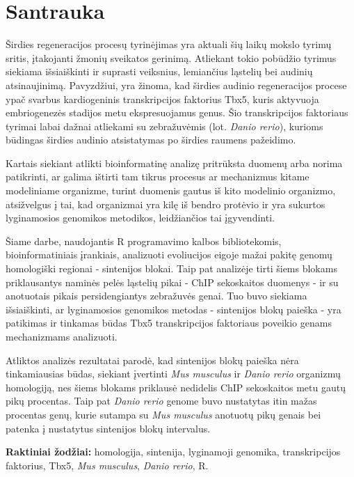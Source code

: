 \documentclass[12pt]{article}
\begin{document}

\section*{Santrauka}
Širdies regeneracijos procesų tyrinėjimas yra aktuali šių laikų mokslo tyrimų
sritis, įtakojanti žmonių sveikatos gerinimą. Atliekant tokio pobūdžio
tyrimus siekiama išsiaiškinti ir suprasti veiksnius, lemiančius ląstelių bei
audinių atsinaujinimą. Pavyzdžiui, yra žinoma, kad širdies audinio regeneracijos
procese ypač svarbus kardiogeninis transkripcijos faktorius Tbx5, kuris
aktyvuoja embriogenezės stadijos metu ekspresuojamus genus. Šio transkripcijos
faktoriaus tyrimai labai dažnai atliekami su zebražuvėmis (lot.
\emph{Danio rerio}), kurioms būdingas širdies audinio atsistatymas po širdies
raumens pažeidimo.

Kartais siekiant atlikti bioinformatinę analizę pritrūksta duomenų arba norima
patikrinti, ar galima ištirti tam tikrus procesus ar mechanizmus kitame
modeliniame organizme, turint duomenis gautus iš kito modelinio organizmo,
atsižvelgus į tai, kad organizmai yra kilę iš bendro protėvio ir yra sukurtos
lyginamosios genomikos metodikos, leidžiančios tai įgyvendinti.

Šiame darbe, naudojantis R programavimo kalbos bibliotekomis, bioinformatiniais
įrankiais, analizuoti evoliucijos eigoje mažai pakitę genomų homologiški
regionai - sintenijos blokai. Taip pat analizėje tirti šiems blokams
priklausantys naminės pelės ląstelių pikai - ChIP sekoskaitos duomenys - ir su
anotuotais pikais persidengiantys zebražuvės genai. Tuo buvo siekiama
išsiaiškinti, ar lyginamosios genomikos metodas - sintenijos blokų paieška -
yra patikimas ir tinkamas būdas Tbx5 transkripcijos faktoriaus poveikio genams
mechanizmams analizuoti.

Atliktos analizės rezultatai parodė, kad sintenijos blokų paieška nėra
tinkamiausias būdas, siekiant įvertinti \emph{Mus musculus} ir
\emph{Danio rerio} organizmų homologiją, nes šiems blokams priklausė nedidelis
ChIP sekoskaitos metu gautų pikų procentas. Taip pat \emph{Danio rerio} genome
buvo nustatytas itin mažas procentas genų, kurie sutampa su \emph{Mus musculus}
anotuotų pikų genais bei patenka į nustatytus sintenijos blokų intervalus.

\hfill \break
\textbf{Raktiniai žodžiai:} homologija, sintenija, lyginamoji genomika,
    transkripcijos faktorius, Tbx5, \emph{Mus musculus}, \emph{Danio rerio}, R.
\end{document}
